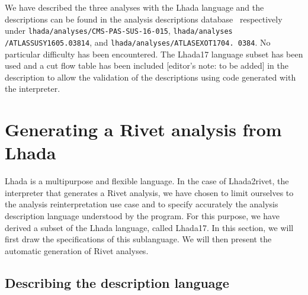 \documentclass[11pt]{cernrep}
\begin{document}
We have described the three analyses with the {\sc Lhada} language and the descriptions can be found in the analysis descriptions database~\cite{bib:lhada_git} respectively under {\tt lhada/analyses/CMS-PAS-SUS-16-015}, {\tt lhada/analyses /ATLASSUSY1605.03814}, and {\tt lhada/analyses/ATLASEXOT1704. 0384}. No particular difficulty has been encountered. The {\sc Lhada17} language subset has been used and a cut flow table has been included [editor's note: to be added] in the description to allow the validation of the descriptions using code generated with the interpreter.


\section{Generating a Rivet analysis from Lhada}

{\sc Lhada} is a multipurpose and flexible language. In the case of {\sc Lhada2rivet}, the interpreter that generates a {\sc Rivet} analysis, we have chosen to limit ourselves to the analysis reinterpretation use case and to specify accurately the analysis description language understood by the program. For this purpose, we have derived a subset of the {\sc Lhada} language, called {\sc Lhada17}. In this section, we will first draw the specifications of this sublanguage. We will then present the automatic generation of Rivet analyses.

\subsection{Describing the description language}\label{sec:desc}

\end{document}
